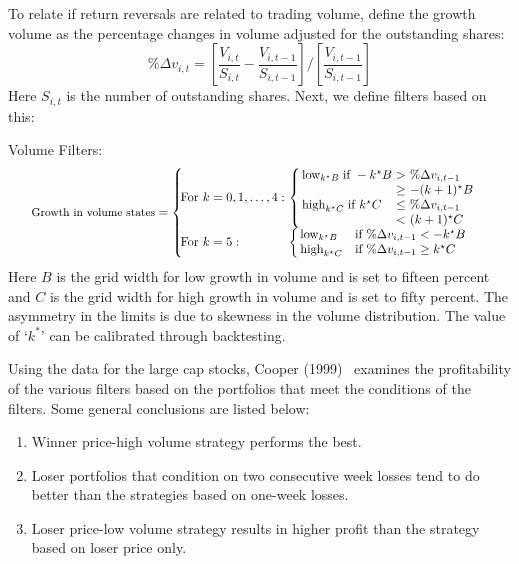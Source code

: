 To relate if return reversals are related to trading volume, define the growth volume as the percentage changes in volume adjusted for the outstanding shares: 
	\begin{equation}\label{eqn:perdeltav}
	\%\Delta v_{i,t} = \left[\frac{V_{i,t}}{S_{i,t}}-\frac{V_{i,t-1}}{S_{i,t-1}}\right] / \left[\frac{V_{i,t-1}}{S_{i,t-1}}\right]
	\end{equation}
Here $S_{i,t}$ is the number of outstanding shares. Next, we define filters based on this: \twomedskip


\noindent Volume Filters: 
	\begin{equation} \label{eqn:volfilter}
	\scalebox{0.89}{$\textrm{\small Growth in volume states} = \left\{ 
	\begin{array}{lllll}
		\!\!\!\!\textrm{For} ~k = 0,1,\ldots,4: & \!\!\!\!\left\{ 
			\begin{array}{lllll}
			\!\!\!\! \textrm{  low}_{k^\star B}\;  \textrm{if } -k^\star B &\!\!\!\!>\!\!\!\! & \!\!\!\! \%\Delta v_{i,t-1} \\
			\!\!\!\!& \!\!\!\!\geq & \!\!\!\!- (k+1)^\star B \\
	\!\!\!\! \textrm{ high}_{k^\star C}\; \textrm{if } k^\star C & \!\!\!\!\leq&\!\!\!\! \%\Delta v_{i,t-1} \\
	&\!\!\!\!<&\!\!\!\!  (k+1)^\star C
			\end{array}
		\right.\\
		\!\!\!\!\textrm{For} ~k = 5: & \!\!\!\!\left\{
		 \begin{array}{ll}
		 \!\!\!\! \textrm{ low}_{k^\star B} & \textrm{if} ~\%\Delta v_{i,t-1} <-k^\star B \\
		 \!\!\!\! \textrm{ high}_{k^\star C} & \textrm{if}  ~\%\Delta v_{i,t-1} \geq  k^\star C
		 	\end{array} \right.
		\end{array} \right. $}
	\end{equation} 
Here $B$ is the grid width for low growth in volume and is set to fifteen percent and $C$ is the grid width for high growth in volume and is set to fifty percent. The asymmetry in the limits is due to skewness in the volume distribution. The value of `$k^*$' can be calibrated through backtesting. 


Using the data for the large cap stocks, Cooper (1999)~\cite{cooper} examines the profitability of the various filters based on the portfolios that meet the conditions of the filters. Some general conclusions are listed below:
	\begin{enumerate}[--]
	\item Winner price-high volume strategy performs the best.
	\item Loser portfolios that condition on two consecutive week losses tend to do better than the strategies based on one-week losses.
	\item Loser price-low volume strategy results in higher profit than the strategy based on loser price only.
	\end{enumerate}



